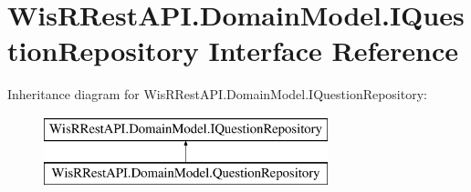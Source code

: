 \hypertarget{interface_wis_r_rest_a_p_i_1_1_domain_model_1_1_i_question_repository}{}\section{Wis\+R\+Rest\+A\+P\+I.\+Domain\+Model.\+I\+Question\+Repository Interface Reference}
\label{interface_wis_r_rest_a_p_i_1_1_domain_model_1_1_i_question_repository}
Inheritance diagram for Wis\+R\+Rest\+A\+P\+I.\+Domain\+Model.\+I\+Question\+Repository\+:\begin{figure}[H]
\begin{center}
\leavevmode
\includegraphics[height=2.000000cm]{interface_wis_r_rest_a_p_i_1_1_domain_model_1_1_i_question_repository}
\end{center}
\end{figure}
